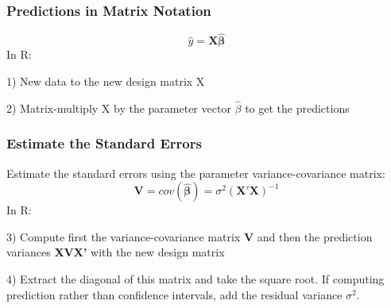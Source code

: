 \documentclass{beamer}
\begin{document}
\begin{frame}
    \frametitle{Predictions in Matrix Notation}
    \begin{equation*}
        \hat{y} = \mathbf{X \hat{\beta}}
    \end{equation*}
    In R:
    \vspace{0.5cm}
    
    1) New data to the new design matrix X
    \scalebox{0.65}{
      
    }
    \vspace{0.5cm}
    
    2) Matrix-multiply X by the parameter vector $\hat\beta$ to get the predictions
    
    \scalebox{0.65}{
      
    }
\end{frame}

\begin{frame}
    \frametitle{Estimate the Standard Errors}
    Estimate the standard errors using the parameter variance-covariance matrix:
    \begin{equation*}
        \mathbf{V} = cov(\mathbf{\hat{\beta}})=\sigma^2 (\mathbf{X}' \mathbf{X})^{-1}
    \end{equation*}
    In R:
    \vspace{0.5cm}

    3) Compute first the variance-covariance matrix \textbf{V} and then the prediction variances \textbf{XVX'} with the new design matrix

    \scalebox{0.65}{
      
    }
    \vspace{0.5cm}
    
    4) Extract the diagonal of this matrix and take the square root. If computing prediction rather than confidence intervals, add the residual variance $\sigma^2$.

    \scalebox{0.7}{
      
    }

    
\end{frame}
\end{document}
